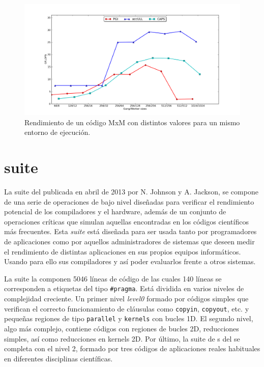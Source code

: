 \begin{figure}[h]
   \centering
   \includegraphics[width=\linewidth]{FIGURES/gemm_flops_varying}
   \caption{Rendimiento de un código \ac{MxM} con distintos valores para un mismo entorno de ejecución.}
   \label{fig:gemm_gangworker}
\end{figure}


\section{\epcc{} \OpenACC{} \benchmark{} suite}
\label{sec:epccBS}

La suite del \epcc{} \OpenACC{} \benchmark{} \cite{URL::ACCepccB}
publicada en abril de 2013 por N. Johnson y A. Jackson, 
se compone de una serie de operaciones de bajo nivel diseñadas para
verificar el rendimiento potencial de los compiladores y el hardware, además de  
un conjunto de operaciones críticas que simulan aquellas encontradas en los códigos
científicos más frecuentes. 
Esta \textit{suite} está diseñada para ser usada tanto por programadores de aplicaciones 
como por aquellos administradores de sistemas que deseen medir el rendimiento de distintas 
aplicaciones en sus propios equipos informáticos. Usando para ello sus compiladores
y así poder evaluarlos frente a otros sistemas.

La suite la componen 5046 líneas de código de las cuales 140 líneas se corresponden a
etiquetas del tipo \texttt{\#pragma}. Está dividida en varios niveles de complejidad 
creciente. Un primer nivel \textit{level0} formado por códigos simples que verifican 
el correcto funcionamiento de cláusulas como \texttt{copyin}, \texttt{copyout}, etc. y 
pequeñas regiones 
de tipo \texttt{parallel} y \texttt{kernels} con bucles 1D. El segundo nivel, algo más
complejo, contiene códigos con regiones de bucles 2D, reducciones simples, así como
reducciones en kernels 2D. Por último, la suite de \benchmark{}s del \epcc{} se completa 
con el nivel 2, formado por tres códigos de aplicaciones reales habituales en 
diferentes disciplinas científicas.

